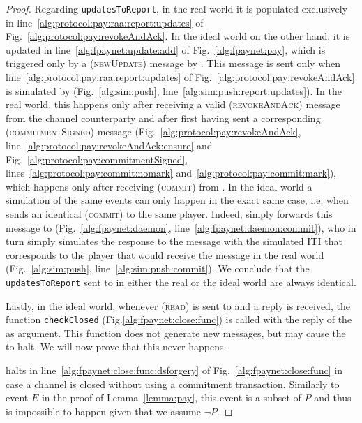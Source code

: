 \begin{proof}
  Regarding \texttt{updatesToReport}, in the real world it is populated
  exclusively in line~\ref{alg:protocol:pay:raa:report:updates} of
  Fig.~\ref{alg:protocol:pay:revokeAndAck}. In the ideal world on the other
  hand, it is updated in line~\ref{alg:fpaynet:update:add} of
  Fig.~\ref{alg:fpaynet:pay}, which is triggered only by a (\textsc{newUpdate})
  message by \simulator. This message is sent only when
  line~\ref{alg:protocol:pay:raa:report:updates} of
  Fig.~\ref{alg:protocol:pay:revokeAndAck} is simulated by \simulator{}
  (Fig.~\ref{alg:sim:push}, line~\ref{alg:sim:push:report:updates}). In the real
  world, this happens only after receiving a valid (\textsc{revokeAndAck})
  message from the channel counterparty and after first having sent a
  corresponding (\textsc{commitmentSigned}) message
  (Fig.~\ref{alg:protocol:pay:revokeAndAck},
  line~\ref{alg:protocol:pay:revokeAndAck:ensure} and
  Fig.~\ref{alg:protocol:pay:commitmentSigned},
  lines~\ref{alg:protocol:pay:commit:nomark}
  and~\ref{alg:protocol:pay:commit:mark}), which happens only after receiving
  (\textsc{commit}) from \environment. In the ideal world a simulation of the
  same events can only happen in the exact same case, i.e. when \environment{}
  sends an identical (\textsc{commit}) to the same player. Indeed, \fpaynet{}
  simply forwards this message to \simulator{} (Fig.~\ref{alg:fpaynet:daemon},
  line~\ref{alg:fpaynet:daemon:commit}), who in turn simply simulates the
  response to the message with the simulated ITI that corresponds to the player
  that would receive the message in the real world (Fig.~\ref{alg:sim:push},
  line~\ref{alg:sim:push:commit}). We conclude that the \texttt{updatesToReport}
  sent to \environment{} in either the real or the ideal world are always
  identical.

  Lastly, in the ideal world, whenever (\textsc{read}) is sent to \ledger{} and
  a reply is received, the function \texttt{checkClosed}
  (Fig.\ref{alg:fpaynet:close:func}) is called with the reply of the \ledger{}
  as argument. This function does not generate new messages, but may cause the
  \fpaynet{} to halt. We will now prove that this never happens.

  \fpaynet{} halts in line~\ref{alg:fpaynet:close:func:dsforgery} of
  Fig.~\ref{alg:fpaynet:close:func} in case a channel is closed without using a
  commitment transaction. Similarly to event $E$ in the proof of
  Lemma~\ref{lemma:pay}, this event is a subset of $P$ and thus is impossible to
  happen given that we assume $\neg P$.


\end{proof}
